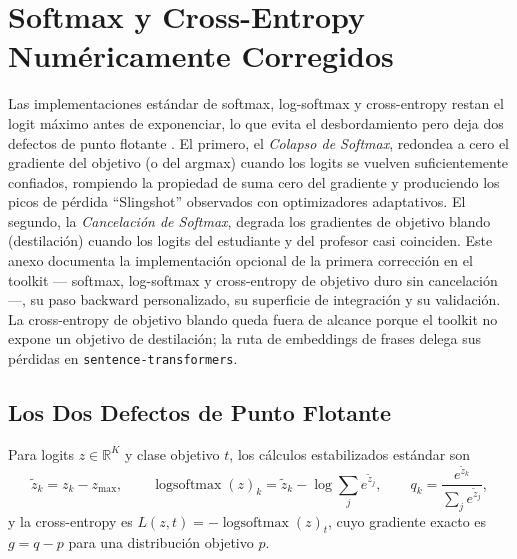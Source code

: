 \section{Softmax y Cross-Entropy Numéricamente Corregidos}
\label{sec:annex-fixed-numerics}

Las implementaciones estándar de softmax, log-softmax y cross-entropy restan el logit máximo antes de exponenciar, lo que evita el desbordamiento pero deja dos defectos de punto flotante \citep{barron_fixed_softmax_ce_2026}. El primero, el \emph{Colapso de Softmax}, redondea a cero el gradiente del objetivo (o del argmax) cuando los logits se vuelven suficientemente confiados, rompiendo la propiedad de suma cero del gradiente y produciendo los picos de pérdida ``Slingshot'' observados con optimizadores adaptativos. El segundo, la \emph{Cancelación de Softmax}, degrada los gradientes de objetivo blando (destilación) cuando los logits del estudiante y del profesor casi coinciden. Este anexo documenta la implementación opcional de la primera corrección en el toolkit --- softmax, log-softmax y cross-entropy de objetivo duro sin cancelación ---, su paso backward personalizado, su superficie de integración y su validación. La cross-entropy de objetivo blando queda fuera de alcance porque el toolkit no expone un objetivo de destilación; la ruta de embeddings de frases delega sus pérdidas en \texttt{sentence-transformers}.

\subsection{Los Dos Defectos de Punto Flotante}

Para logits $z \in \mathbb{R}^{K}$ y clase objetivo $t$, los cálculos estabilizados estándar son
\begin{equation}
\tilde{z}_k = z_k - z_{\max}, \qquad
\operatorname{logsoftmax}(z)_k = \tilde{z}_k - \log \sum_j e^{\tilde{z}_j}, \qquad
q_k = \frac{e^{\tilde{z}_k}}{\sum_j e^{\tilde{z}_j}},
\label{eq:standard-softmax}
\end{equation}
y la cross-entropy es $L(z,t) = -\operatorname{logsoftmax}(z)_t$, cuyo gradiente exacto es $g = q - p$ para una distribución objetivo $p$.

